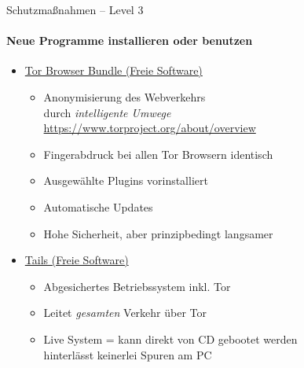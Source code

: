 \begin{frame}{Schutzmaßnahmen -- Level 3}
\framesubtitle{Neue Programme installieren oder benutzen}
  \begin{itemize}
    \item \href{https://www.torproject.org}{Tor Browser Bundle (Freie Software)}
    \begin{itemize}
      \item Anonymisierung des Webverkehrs\\durch \emph{\glqq intelligente Umwege\grqq}\\
        {\small\url{https://www.torproject.org/about/overview}}
      \item Fingerabdruck bei allen Tor Browsern identisch
      \item Ausgewählte Plugins vorinstalliert
      \item Automatische Updates
      \item Hohe Sicherheit, aber prinzipbedingt langsamer
    \end{itemize}
    \pause
    \item \href{https://tails.boum.org}{Tails (Freie Software)}
    \begin{itemize}
      \item Abgesichertes Betriebssystem inkl. Tor
      \item Leitet \emph{gesamten} Verkehr über Tor
      \item Live System = kann direkt von CD gebootet werden\\ hinterlässt keinerlei Spuren am PC
    \end{itemize}
  \end{itemize}
\end{frame}

\endinput
